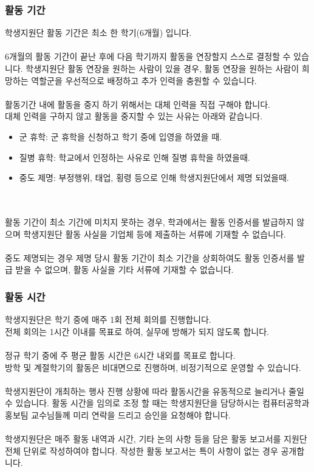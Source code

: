 \subsubsection{활동 기간}
학생지원단 활동 기간은 최소 한 학기(6개월) 입니다.\\
\\
6개월의 활동 기간이 끝난 후에 다음 학기까지 활동을 연장할지 스스로 결정할 수 있습니다. 학생지원단 활동 연장을 원하는 사람이 있을 경우, 활동 연장을 원하는 사람이 희망하는 역할군을 우선적으로 배정하고 추가 인력을 충원할 수 있습니다. \\
\\
활동기간 내에 활동을 중지 하기 위해서는 대체 인력을 직접 구해야 합니다.\\
대체 인력을 구하지 않고 활동을 중지할 수 있는 사유는 아래와 같습니다.
\begin{itemize}
    \item 군 휴학: 군 휴학을 신청하고 학기 중에 입영을 하였을 때.
    \item 질병 휴학: 학교에서 인정하는 사유로 인해 질병 휴학을 하였을때.
    \item 중도 제명: 부정행위, 태업, 횡령 등으로 인해 학생지원단에서 제명 되었을때.
\end{itemize}
\text{  }\\
\text{  }\\
활동 기간이 최소 기간에 미치지 못하는 경우, 학과에서는 활동 인증서를 발급하지 않으며 학생지원단 활동 사실을 기업체 등에 제출하는 서류에 기재할 수 없습니다.\\
\\
중도 제명되는 경우 제명 당시 활동 기간이 최소 기간을 상회하여도 활동 인증서를 발급 받을 수 없으며, 활동 사실을 기타 서류에 기재할 수 없습니다.\\

\subsubsection{활동 시간}
학생지원단은 학기 중에 매주 1회 전체 회의를 진행합니다.\\
전체 회의는 1시간 이내를 목표로 하여, 실무에 방해가 되지 않도록 합니다.\\
\\
정규 학기 중에 주 평균 활동 시간은 6시간 내외를 목표로 합니다.\\
방학 및 계절학기의 활동은 비대면으로 진행하며, 비정기적으로 운영할 수 있습니다.\\
\\
학생지원단이 개최하는 행사 진행 상황에 따라 활동시간을 유동적으로 늘리거나 줄일 수 있습니다. 활동 시간을 임의로 조정 할 때는 학생지원단을 담당하시는 컴퓨터공학과 홍보팀 교수님들께 미리 연락을 드리고 승인을 요청해야 합니다.\\
\\
학생지원단은 매주 활동 내역과 시간, 기타 논의 사항 등을 담은 활동 보고서를 지원단 전체 단위로 작성하여야 합니다. 작성한 활동 보고서는 특이 사항이 없는 경우 공개합니다.

